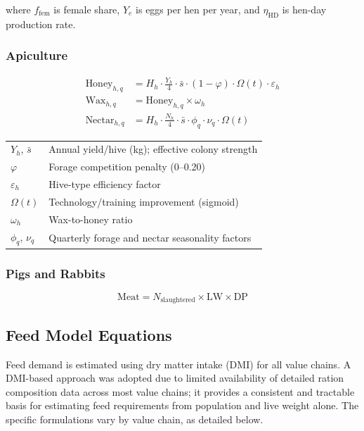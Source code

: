where $f_{\mathrm{fem}}$ is female share, $Y_e$ is eggs per hen per year, and $\eta_{\mathrm{HD}}$ is hen-day production rate.

\subsubsection{Apiculture}
\begin{align}
\text{Honey}_{h,q} &= H_h \cdot \frac{Y_h}{4} \cdot \bar{s} \cdot (1 - \varphi) \cdot \Omega(t) \cdot \varepsilon_h \\
\text{Wax}_{h,q}   &= \text{Honey}_{h,q} \times \omega_h \\
\text{Nectar}_{h,q}&= H_h \cdot \frac{N_h}{4} \cdot \bar{s} \cdot \phi_q \cdot \nu_q \cdot \Omega(t)
\end{align}

{\small
\begin{tabular}{@{}p{}@{\;}p{}@{}}
$Y_h$, $\bar{s}$   & Annual yield/hive (kg); effective colony strength \\
$\varphi$          & Forage competition penalty (0--0.20) \\
$\varepsilon_h$    & Hive-type efficiency factor \\
$\Omega(t)$        & Technology/training improvement (sigmoid) \\
$\omega_h$         & Wax-to-honey ratio \\
$\phi_q$, $\nu_q$  & Quarterly forage and nectar seasonality factors \\
\end{tabular}}

\subsubsection{Pigs and Rabbits}
\begin{equation}
\text{Meat} = N_{\text{slaughtered}} \times \mathrm{LW} \times \mathrm{DP}
\end{equation}

\subsection{Feed Model Equations}
Feed demand is estimated using dry matter intake (DMI) for all value chains. A DMI-based approach was adopted due to limited availability of detailed ration composition data across most value chains; it provides a consistent and tractable basis for estimating feed requirements from population and live weight alone. The specific formulations vary by value chain, as detailed below.

